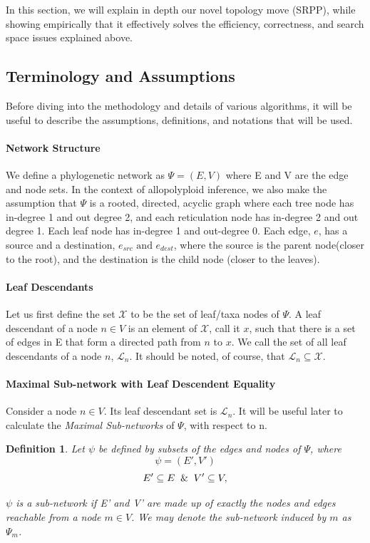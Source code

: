 \documentclass{article}
\newtheorem{definition}{\color{bluem}Definition}
\begin{document}
In this section, we will explain in depth our novel topology move (SRPP), while showing empirically that it effectively solves the efficiency, correctness, and search space issues explained above.


\subsection{Terminology and Assumptions}
Before diving into the methodology and details of various algorithms, it will be useful to describe the assumptions, definitions, and notations that will be used. 

\paragraph{Network Structure}
We define a phylogenetic network as $\Psi = (E, V)$ where E and V are the edge and node sets. In the context of allopolyploid inference, we also make the assumption that $\Psi$ is a rooted, directed, acyclic graph where each tree node has in-degree 1 and out degree 2, and each reticulation node has in-degree 2 and out degree 1. Each leaf node has in-degree 1 and out-degree 0. Each edge, $e$, has a source and a destination, $e_{src} \text{ and } e_{dest}$, where the source is the parent node(closer to the root), and the destination is the child node (closer to the leaves).

\paragraph{Leaf Descendants}
Let us first define the set $\mathcal{X}$ to be the set of leaf/taxa nodes of $\Psi$. A leaf descendant of a node $n \in V$ is an element of $\mathcal{X}$, call it $x$, such that there is a set of edges in E that form a directed path from $n$ to $x$. We call the set of all leaf descendants of a node $n$, $\mathcal{L}_n$. It should be noted, of course, that $\mathcal{L}_n \subseteq \mathcal{X}$.

\paragraph{Maximal Sub-network with Leaf Descendent Equality}
Consider a node $n \in V$. Its leaf descendant set is $\mathcal{L}_n$. It will be useful later to calculate the \textit{Maximal Sub-networks} of $\Psi$, with respect to n. 

\begin{definition}
    Let $\psi$ be defined by subsets of the edges and nodes of $\Psi$, where
    \[\psi = (E', V')\]
    \[ E' \subseteq E \And V' \subseteq V, \]

    $\psi$ is a sub-network if E' and V' are made up of exactly the nodes and edges reachable from a node $m \in V$. We may denote the sub-network induced by $m$ as $\Psi_{m}$.
\end{definition}
\end{document}
